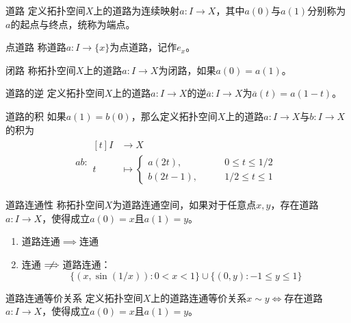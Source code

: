 \documentclass[lang = cn, scheme = chinese, thmcnt = section, usesamecnt]{elegantbook}
\begin{document}
\begin{definition}{道路}
	定义拓扑空间$X$上的道路为连续映射$a: I \to X$，其中$a(0)$与$a(1)$分别称为$a$的起点与终点，统称为端点。
\end{definition}

\begin{definition}{点道路}
	称道路$a: I \to\{x\}$为点道路，记作$e_x$。
\end{definition}

\begin{definition}{闭路}
	称拓扑空间$X$上的道路$a: I \to X$为闭路，如果$a(0)=a(1)$。
\end{definition}

\begin{definition}{道路的逆}
	定义拓扑空间$X$上的道路$a: I \to X$的逆$\overline{a}: I \to X$为$\overline{a}(t)=a(1-t)$。
\end{definition}

\begin{definition}{道路的积}
	如果$a(1)=b(0)$，那么定义拓扑空间$X$上的道路$a: I \to X$与$b: I \to X$的积为
	\begin{align*}
		ab:\begin{aligned}[t]
			I &\longrightarrow X\\
			t&\longmapsto\begin{cases}
				a(2t),\qquad & 0\le t\le 1/2\\
				b(2t-1),\qquad & 1/2\le t \le 1
			\end{cases}
		\end{aligned}
	\end{align*}
\end{definition}

\begin{definition}{道路连通性}
	称拓扑空间$X$为道路连通空间，如果对于任意点$x,y$，存在道路$a: I \to X$，使得成立$a(0)=x$且$a(1)=y$。
\end{definition}

\begin{remark}
	\begin{enumerate}
		\item 道路连通$\implies$连通
		\item 连通$\centernot\implies$道路连通：
		$$
		\{ (x,\sin(1/x)):0<x <1 \}\cup\{ (0,y):-1\le y\le 1 \}
		$$
	\end{enumerate}
\end{remark}

\begin{definition}{道路连通等价关系}
	定义拓扑空间$X$上的道路连通等价关系$x\sim y\iff$存在道路$a: I \to X$，使得成立$a(0)=x$且$a(1)=y$。
\end{definition}
\end{document}
